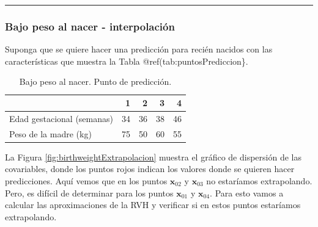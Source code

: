 \documentclass[
]{article}
\begin{document}
\rule{\textwidth}{0.4pt}

\hypertarget{bajo-peso-al-nacer---interpolaciuxf3n}{%
\subsubsection*{Bajo peso al nacer - interpolación}\label{bajo-peso-al-nacer---interpolaciuxf3n}}

Suponga que se quiere hacer una predicción para recién nacidos con las características que muestra la Tabla @ref(tab:puntosPrediccion\}.

\begin{table}

\caption{\label{tab:puntosPrediccion}Bajo peso al nacer. Punto de predicción.}
\centering
\begin{tabular}[t]{lrrrr}
\toprule
  & 1 & 2 & 3 & 4\\
\midrule
Edad gestacional (semanas) & 34 & 36 & 38 & 46\\
Peso de la madre (kg) & 75 & 50 & 60 & 55\\
\bottomrule
\end{tabular}
\end{table}

La Figura \ref{fig:birthweightExtrapolacion} muestra el gráfico de dispersión de las covariables, donde los puntos rojos indican los valores donde se quieren hacer predicciones. Aquí vemos que en los puntos \(\boldsymbol x_{02}\) y \(\boldsymbol x_{03}\) no estaríamos extrapolando. Pero, es difícil de determinar para los puntos \(\boldsymbol x_{01}\) y \(\boldsymbol x_{04}\). Para esto vamos a calcular las aproximaciones de la RVH y verificar si en estos puntos estaríamos extrapolando.
\end{document}
